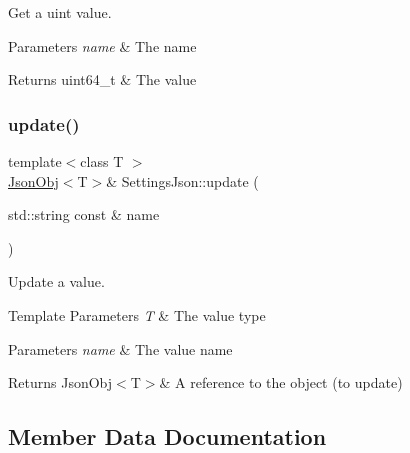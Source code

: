 Get a uint value. 


\begin{DoxyParams}{Parameters}
{\em name} & The name \\
\hline
\end{DoxyParams}
\begin{DoxyReturn}{Returns}
uint64\+\_\+t \& The value 
\end{DoxyReturn}
\mbox{\label{class_settings_json_ae11e812ff606270e59007c1000c7434c}} 
\subsubsection{\texorpdfstring{update()}{update()}}
{\footnotesize\ttfamily template$<$class T $>$ \\
\hyperlink{class_json_obj}{Json\+Obj}$<$T$>$\& Settings\+Json\+::update (\begin{DoxyParamCaption}\item[{std\+::string const \&}]{name }\end{DoxyParamCaption})\hspace{0.3cm}{\ttfamily [inline]}}



Update a value. 


\begin{DoxyTemplParams}{Template Parameters}
{\em T} & The value type \\
\hline
\end{DoxyTemplParams}

\begin{DoxyParams}{Parameters}
{\em name} & The value name \\
\hline
\end{DoxyParams}
\begin{DoxyReturn}{Returns}
Json\+Obj$<$\+T$>$\& A reference to the object (to update) 
\end{DoxyReturn}


\subsection{Member Data Documentation}
\mbox{\label{class_settings_json_a34a59bde0b2758c8d9160681cc0e666e}} 
